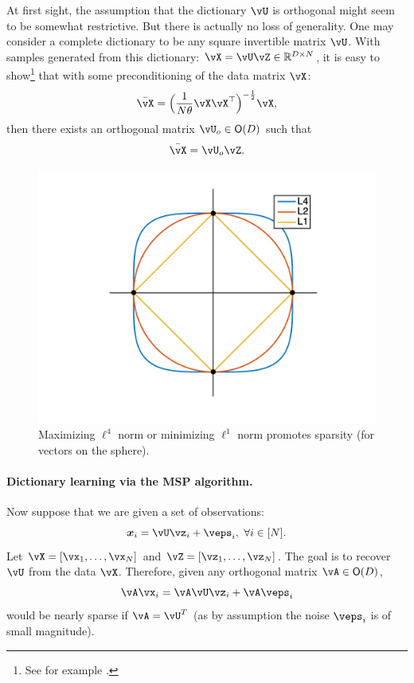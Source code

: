 \documentclass[../../book-main.tex]{subfiles}
\begin{document}
\begin{remark} 
At first sight, the assumption that the dictionary $\vU$ is orthogonal might seem to be somewhat restrictive. But there is actually no loss of generality. One may consider a complete dictionary to be any square invertible matrix $\vU$. With samples generated from this dictionary: $\vX = \vU \vZ \in \mathbb{R}^{D\times N}$, it is easy to show\footnote{See for example \cite{sun2017completeI}.} that with some preconditioning of the data matrix $\vX$: 
\begin{equation}
    \bar{\vX} = \Big(\frac{1}{N\theta} \vX\vX^\top\Big)^{-\frac{1}{2}}\vX,
\end{equation}
then there exists an orthogonal matrix $\vU_{o} \in \O(D)$ such that
\begin{equation}
    \bar{\vX} = \vU_{o}\vZ.
\end{equation}
\end{remark}



\begin{figure}
    \centering
    \includegraphics[width=0.6\linewidth]{figs_chap2/2DL4Sphere.png}\vspace{-0.1in}
    \caption{Maximizing $\ell^4$ norm or minimizing $\ell^1$ norm promotes sparsity (for vectors on the sphere).}
    \label{fig:L4-sphere}
\end{figure}


\paragraph{Dictionary learning via the MSP algorithm.}

Now suppose that we are given a set of observations:
\begin{equation}
    \x_i = \vU \vz_i + \veps_i,\ \forall i \in [N].
\end{equation}
Let $\vX = [\vx_1, \dots, \vx_N]$ and $\vZ = [\vz_1, \dots, \vz_N]$. The goal is to recover $\vU$ from the data $\vX$. Therefore, given any orthogonal matrix $\vA \in \O(D)$, 
\begin{equation}
    \vA\vx_i = \vA\vU \vz_i + \vA\veps_i
\end{equation}
would be nearly sparse if $\vA = \vU^T$ (as by assumption the noise $\veps_i$ is of small magnitude). 
\end{document}
